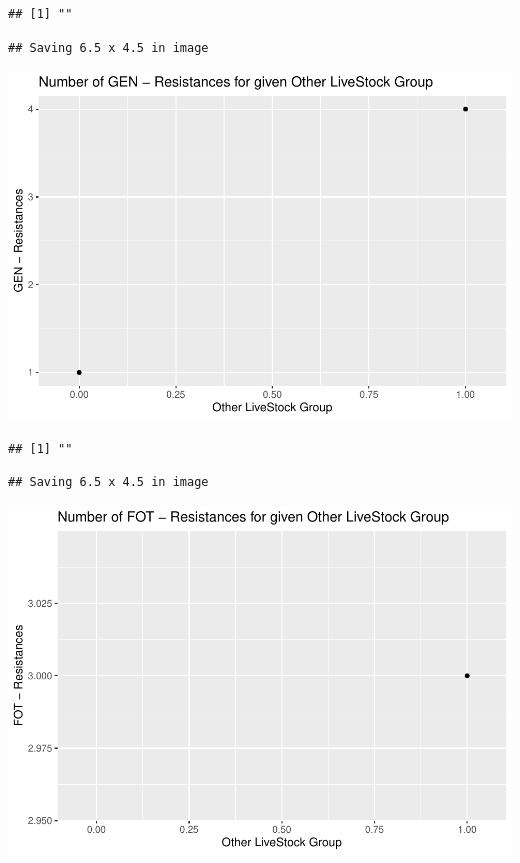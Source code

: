 \documentclass[
]{article}
\begin{document}
\begin{verbatim}
## [1] ""
\end{verbatim}

\begin{verbatim}
## Saving 6.5 x 4.5 in image
\end{verbatim}

\includegraphics{NResistenzen_files/figure-latex/binary_or_nominal_variables-14.pdf}

\begin{verbatim}
## [1] ""
\end{verbatim}

\begin{verbatim}
## Saving 6.5 x 4.5 in image
\end{verbatim}

\includegraphics{NResistenzen_files/figure-latex/binary_or_nominal_variables-15.pdf}
\end{document}
